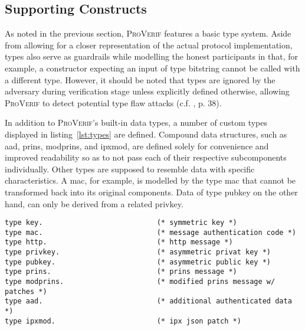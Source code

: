 \lstset{style=proverif}

\subsection{Supporting Constructs}

As noted in the previous section, \textsc{ProVerif} features a basic type system.
Aside from allowing for a closer representation of the actual protocol implementation, types also serve as guardrails while modelling the honest participants in that, for example, a constructor expecting an input of type bitstring cannot be called with a different type.
However, it should be noted that types are ignored by the adversary during verification stage unless explicitly defined otherwise, allowing \textsc{ProVerif} to detect potential type flaw attacks (c.f. \cite{blanchet2020proverif}, p. 38).

In addition to \textsc{ProVerif}'s built-in data types, a number of custom types displayed in listing~\ref{lst:types} are defined.
Compound data structures, such as {\sffamily aad}, {\sffamily prins}, {\sffamily modprins}, and {\sffamily ipxmod}, are defined solely for convenience and improved readability so as to not pass each of their respective subcomponents individually.
Other types are supposed to resemble data with specific characteristics.
A \gls{mac}, for example, is modelled by the type {\sffamily mac} that cannot be transformed back into its original components.
Data of type {\sffamily pubkey} on the other hand, can only be derived from a related {\sffamily privkey}.

\begin{lstlisting}[caption={Custom type definitions},label={lst:types},firstnumber=11]
type key.                           (* symmetric key *)
type mac.                           (* message authentication code *)
type http.                          (* http message *)
type privkey.                       (* asymmetric privat key *)
type pubkey.                        (* asymmetric public key *)
type prins.                         (* prins message *)
type modprins.                      (* modified prins message w/ patches *)
type aad.                           (* additional authenticated data *)
type ipxmod.                        (* ipx json patch *)
\end{lstlisting}

